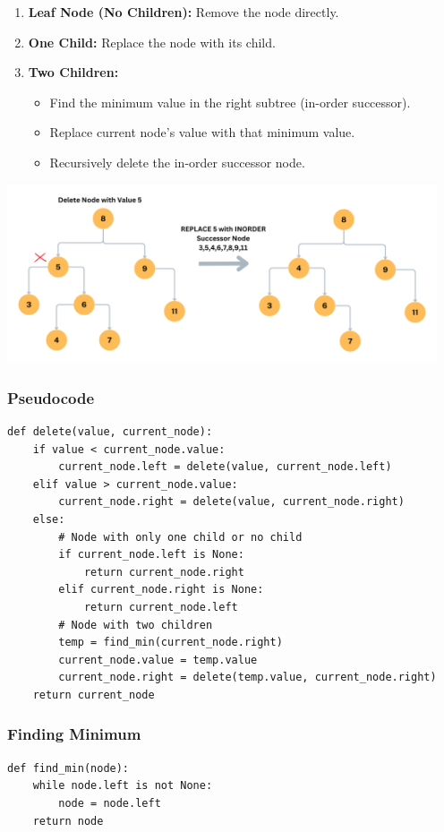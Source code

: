 \begin{enumerate}
    \item \textbf{Leaf Node (No Children):} Remove the node directly.
    \item \textbf{One Child:} Replace the node with its child.
    \item \textbf{Two Children:}
    \begin{itemize}
        \item Find the minimum value in the right subtree (in-order successor).
        \item Replace current node’s value with that minimum value.
        \item Recursively delete the in-order successor node.
    \end{itemize}
\end{enumerate}
\begin{center}
    \includegraphics[width=5in]{../9. rBST/Notes/Assets/Node_Deletion_BST}    
\end{center}
\subsubsection*{Pseudocode}
\begin{verbatim}
def delete(value, current_node):
    if value < current_node.value:
        current_node.left = delete(value, current_node.left)
    elif value > current_node.value:
        current_node.right = delete(value, current_node.right)
    else:
        # Node with only one child or no child
        if current_node.left is None:
            return current_node.right
        elif current_node.right is None:
            return current_node.left
        # Node with two children
        temp = find_min(current_node.right)
        current_node.value = temp.value
        current_node.right = delete(temp.value, current_node.right)
    return current_node
\end{verbatim}

\subsubsection*{Finding Minimum}
\begin{verbatim}
def find_min(node):
    while node.left is not None:
        node = node.left
    return node
\end{verbatim}

